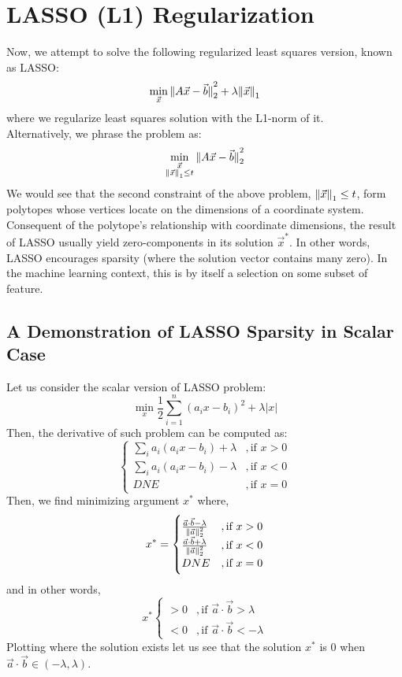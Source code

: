 \section{LASSO (L1) Regularization}
Now, we attempt to solve the following regularized least squares version, known as LASSO:
\[
    \min_{\vec{x}} \pnorm[2]{A \vec{x} - \vec{b}}{2} + \lambda \pnorm{\vec{x}}{1}
\]
where we regularize least squares solution with the L1-norm of it. \\
Alternatively, we phrase the problem as:
\[
    \min_{
        \substack{
            \vec{x} \\
            \pnorm{\vec{x}}{1} \leq t
        }
    } \pnorm[2]{A \vec{x} - \vec{b}}{2}
\]
We would see that the second constraint of the above problem, $\pnorm{\vec{x}}{1} \leq t$, form polytopes whose vertices locate on the dimensions of a coordinate system. \\
Consequent of the polytope's relationship with coordinate dimensions, the result of LASSO usually yield zero-components in its solution $\vec{x}^*$.
In other words, LASSO encourages sparsity (where the solution vector contains many zero).
In the machine learning context, this is by itself a selection on some subset of feature.

\subsection{A Demonstration of LASSO Sparsity in Scalar Case}
Let us consider the scalar version of LASSO problem:
\[
    \min_x \frac{1}{2} \sum_{i = 1}^n {(a_i x - b_i)}^2 + \lambda |x|
\]
Then, the derivative of such problem can be computed as:
\[
    \begin{cases}
        \sum_i a_i(a_i x - b_i) + \lambda &, \text{if } x > 0 \\
        \sum_i a_i(a_i x - b_i) - \lambda &, \text{if } x < 0 \\
        DNE &, \text{if } x = 0
    \end{cases}
\]
Then, we find minimizing argument $x^*$ where,
\[
    x^* =
    \begin{cases}
        \frac{\vec{a} \cdot \vec{b} - \lambda}{\pnorm[2]{\vec{a}}{2}} &, \text{if } x > 0 \\
        \frac{\vec{a} \cdot \vec{b} + \lambda}{\pnorm[2]{\vec{a}}{2}} &, \text{if } x < 0 \\
        DNE &, \text{if } x = 0
    \end{cases}
\]
and in other words,
\[
    x^*
    \begin{cases}
        > 0 &, \text{if } \vec{a} \cdot \vec{b} > \lambda \\
        < 0 &, \text{if } \vec{a} \cdot \vec{b} < -\lambda
    \end{cases}
\]
Plotting where the solution exists let us see that the solution $x^*$ is $0$ when $\vec{a} \cdot \vec{b} \in (-\lambda, \lambda)$.
